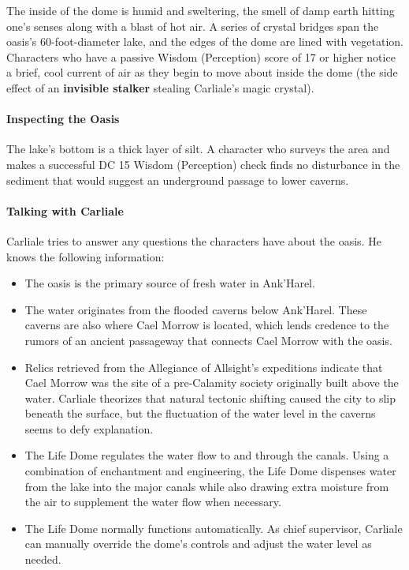 \documentclass[10pt,a4,twoside,twocolumn,openany,nodeprecatedcode]{dndbook}
\begin{document}
The inside of the dome is humid and sweltering, the smell of damp earth hitting one's senses along with a blast of hot air. A series of crystal bridges span the oasis's 60-foot-diameter lake, and the edges of the dome are lined with vegetation. Characters who have a passive Wisdom (Perception) score of 17 or higher notice a brief, cool current of air as they begin to move about inside the dome (the side effect of an \textbf{invisible stalker} stealing Carliale's magic crystal).
\paragraph{Inspecting the Oasis}
The lake's bottom is a thick layer of silt. A character who surveys the area and makes a successful DC 15 Wisdom (Perception) check finds no disturbance in the sediment that would suggest an underground passage to lower caverns.
\paragraph{Talking with Carliale}
Carliale tries to answer any questions the characters have about the oasis. He knows the following information:
\begin{itemize}

\item The oasis is the primary source of fresh water in Ank'Harel.
\item The water originates from the flooded caverns below Ank'Harel. These caverns are also where Cael Morrow is located, which lends credence to the rumors of an ancient passageway that connects Cael Morrow with the oasis.
\item Relics retrieved from the Allegiance of Allsight's expeditions indicate that Cael Morrow was the site of a pre-Calamity society originally built above the water. Carliale theorizes that natural tectonic shifting caused the city to slip beneath the surface, but the fluctuation of the water level in the caverns seems to defy explanation.
\item The Life Dome regulates the water flow to and through the canals. Using a combination of enchantment and engineering, the Life Dome dispenses water from the lake into the major canals while also drawing extra moisture from the air to supplement the water flow when necessary.
\item The Life Dome normally functions automatically. As chief supervisor, Carliale can manually override the dome's controls and adjust the water level as needed.
\end{itemize}
\end{document}
